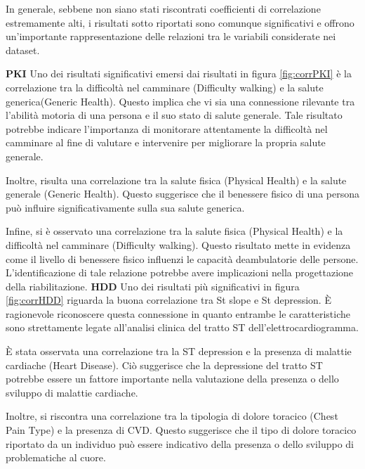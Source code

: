 In generale, sebbene non siano stati riscontrati coefficienti di correlazione estremamente alti, i risultati sotto riportati sono comunque significativi e offrono un'importante rappresentazione delle relazioni tra le variabili considerate nei dataset. 
\begin{flushleft}
    
\newline
\textbf{PKI}
\newline
Uno dei risultati significativi emersi dai risultati in figura \ref{fig:corrPKI} è la correlazione  tra la difficoltà nel camminare (Difficulty walking) e la salute generica(Generic Health). Questo implica che vi sia una connessione rilevante tra l'abilità motoria di una persona e il suo stato di salute generale. Tale risultato potrebbe indicare l'importanza di monitorare attentamente la difficoltà nel camminare al fine di valutare e intervenire  per migliorare la propria salute generale.

Inoltre, risulta una correlazione tra la salute fisica (Physical Health) e la salute generale (Generic Health). Questo suggerisce che il benessere fisico di una persona può influire significativamente sulla sua salute generica.

Infine, si è  osservato una correlazione tra la salute fisica (Physical Health) e la difficoltà nel camminare (Difficulty walking). Questo risultato mette in evidenza come il livello di benessere fisico influenzi le capacità deambulatorie delle persone. L'identificazione di tale relazione potrebbe avere implicazioni nella progettazione della riabilitazione.
\newline
\textbf{HDD}
\newline
Uno dei risultati più significativi in figura \ref{fig:corrHDD} riguarda la buona correlazione tra St slope e St depression. 
È ragionevole riconoscere questa connessione in quanto entrambe le caratteristiche sono strettamente legate all'analisi clinica del tratto ST \cite{stsegment}dell'elettrocardiogramma.

È stata osservata una correlazione tra la ST depression e la presenza di malattie cardiache (Heart Disease). Ciò suggerisce che la depressione del tratto ST potrebbe essere un fattore importante nella valutazione della presenza o dello sviluppo di malattie cardiache. 

Inoltre, si riscontra una correlazione  tra la tipologia di dolore toracico (Chest Pain Type) e la presenza di CVD. Questo suggerisce che il tipo di dolore toracico riportato da un individuo può essere indicativo della presenza o dello sviluppo di problematiche al cuore.


\end{flushleft}
